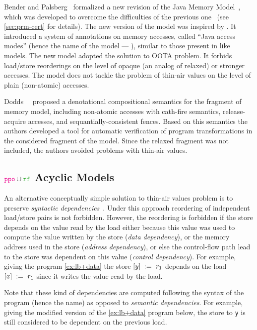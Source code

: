 Bender and Palsberg~\cite{Bender-Palsberg:OOPSLA19} formalized a new revision 
of the Java Memory Model~\cite{JDK9-VarHandle, JEP:193, JDK9-Modes}, 
which was developed to overcome 
the difficulties of the previous one~\cite{Manson-al:POPL05}
(see \ref{sec:prm-cert} for details).
The new version of the model was inspired by \RCMM. 
It introduced a system of annotations on memory accesses, 
called ``Java access modes'' (hence the name of the model --- \JAM),
similar to those present in \CMM like models.
The new model adopted the \RCMM solution to OOTA problem. 
It forbids load/store reorderings on the level of 
opaque (an analog of \CPP relaxed) or stronger accesses.
The model does not tackle the problem of 
thin-air values on the level of plain (\ie non-atomic) accesses.

Dodds~\etal~\cite{Dodds-al:ESOP18} proposed a denotational 
compositional semantics for the fragment of \CMM memory model, 
including non-atomic accesses with cath-fire semantics, 
release-acquire accesses, and sequantially-consistent fences. 
Based on this semantics the authors developed 
a tool for automatic verification of program transformations
in the considered fragment of the \CMM model. 
Since the relaxed fragment was not included, 
the authors avoided problems with thin-air values. 

\subsection{$\lPPO\cup\lRF$ Acyclic Models}
\label{sec:pporf-acyc}

An alternative conceptually simple solution 
to thin-air values problem is to preserve 
\emph{syntactic dependencies}~\cite{Boehm-Demsky:MSPC14, Alglave-al:ASPLOS18}.
Under this approach reordering of independent load/store pairs is not forbidden.
However, the reordering is forbidden if the store depends on the value 
read by the load either because this value 
was used to compute the value written by the store (\emph{data dependency}), 
or the memory address used in the store (\emph{address dependency}),
or else the control-flow path lead to the store was dependent
on this value (\emph{control dependency}).
For example, giving the program \ref{ex:lb+data} 
the store $[y]\;:=_{}\;r_1$ depends 
on the load $[x]\;:=_{}\;r_1$ since 
it writes the value read by the load.

Note that these kind of dependencies are computed following the 
syntax of the program (hence the name) as opposed 
to \emph{semantic dependencies}.
For example, giving the modified version of the \ref{ex:lb+data} program below, 
the store to \texttt{y} is still considered to be dependent on the previous load. 

